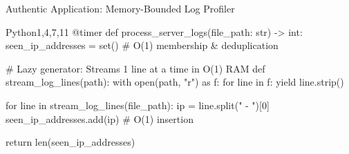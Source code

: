 \begin{frame}[fragile]{Authentic Application: Memory-Bounded Log Profiler}
  \begin{HighlightedCodeBlock}{Python}{1,4,7,11}
@timer
def process_server_logs(file_path: str) -> int:
    seen_ip_addresses = set()  # O(1) membership & deduplication

    # Lazy generator: Streams 1 line at a time in O(1) RAM
    def stream_log_lines(path):
        with open(path, "r") as f:
            for line in f:
                yield line.strip()

    for line in stream_log_lines(file_path):
        ip = line.split(" - ")[0]
        seen_ip_addresses.add(ip)  # O(1) insertion

    return len(seen_ip_addresses)
  \end{HighlightedCodeBlock}
  \vfill
\end{frame}


